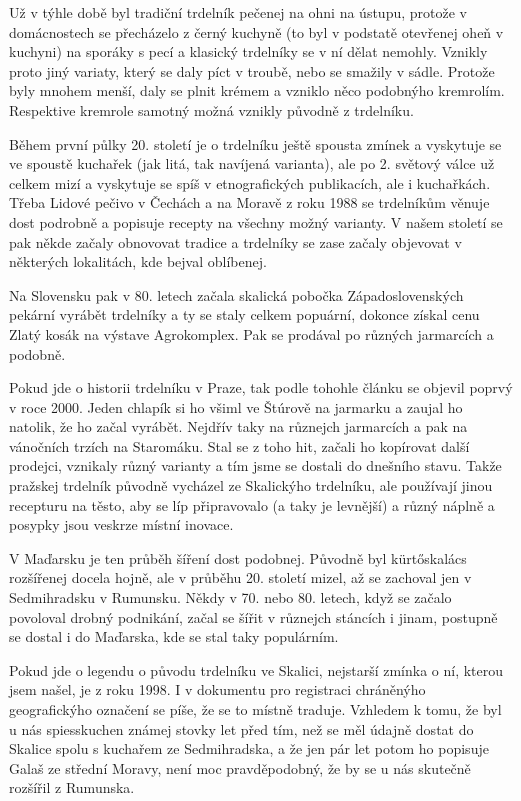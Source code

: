 \documentclass[a5paper,10pt]{book}
\begin{document}
Už v týhle době byl tradiční trdelník pečenej na ohni na ústupu, protože v
domácnostech se přecházelo z černý kuchyně (to byl v podstatě otevřenej oheň v
kuchyni) na sporáky s pecí a klasický trdelníky se v ní dělat nemohly. Vznikly
proto jiný variaty, který se daly píct v troubě, nebo se smažily v sádle.
Protože byly mnohem menší, daly se plnit krémem a vzniklo něco podobnýho
kremrolím. Respektive kremrole samotný možná vznikly původně z trdelníku.

Během první půlky 20. století je o trdelníku ještě spousta zmínek a vyskytuje
se ve spoustě kuchařek (jak litá, tak navíjená varianta), ale po 2. světový
válce už celkem mizí a vyskytuje se spíš v etnografických publikacích, ale i
kuchařkách. Třeba Lidové pečivo v Čechách a na Moravě z roku 1988 se trdelníkům
věnuje dost podrobně a popisuje recepty na všechny možný varianty. V našem
století se pak někde začaly obnovovat tradice a trdelníky se zase začaly
objevovat v některých lokalitách, kde bejval oblíbenej.

Na Slovensku pak v 80. letech začala skalická pobočka Západoslovenských pekární
vyrábět trdelníky a ty se staly celkem popuární, dokonce získal cenu Zlatý
kosák na výstave Agrokomplex. Pak se prodával po různých jarmarcích a podobně.

Pokud jde o historii trdelníku v Praze, tak podle tohohle článku se objevil
poprvý v roce 2000. Jeden chlapík si ho všiml ve Štúrově na jarmarku a zaujal
ho natolik, že ho začal vyrábět. Nejdřív taky na různejch jarmarcích a pak na
vánočních trzích na Staromáku. Stal se z toho hit, začali ho kopírovat další
prodejci, vznikaly různý varianty a tím jsme se dostali do dnešního stavu.
Takže pražskej trdelník původně vycházel ze Skalickýho trdelníku, ale používají
jinou recepturu na těsto, aby se líp připravovalo (a taky je levnější) a různý
náplně a posypky jsou veskrze místní inovace.

V Maďarsku je ten průběh šíření dost podobnej. Původně byl kürtőskalács
rozšířenej docela hojně, ale v průběhu 20. století mizel, až se zachoval jen v
Sedmihradsku v Rumunsku. Někdy v 70. nebo 80. letech, když se začalo povoloval
drobný podnikání, začal se šířit v různejch stáncích i jinam, postupně se
dostal i do Maďarska, kde se stal taky populárním.

Pokud jde o legendu o původu trdelníku ve Skalici, nejstarší zmínka o ní,
kterou jsem našel, je z roku 1998. I v dokumentu pro registraci chráněnýho
geografickýho označení se píše, že se to místně traduje. Vzhledem k tomu, že
byl u nás spiesskuchen známej stovky let před tím, než se měl údajně dostat do
Skalice spolu s kuchařem ze Sedmihradska, a že jen pár let potom ho popisuje
Galaš ze střední Moravy, není moc pravděpodobný, že by se u nás skutečně
rozšířil z Rumunska.
\end{document}
